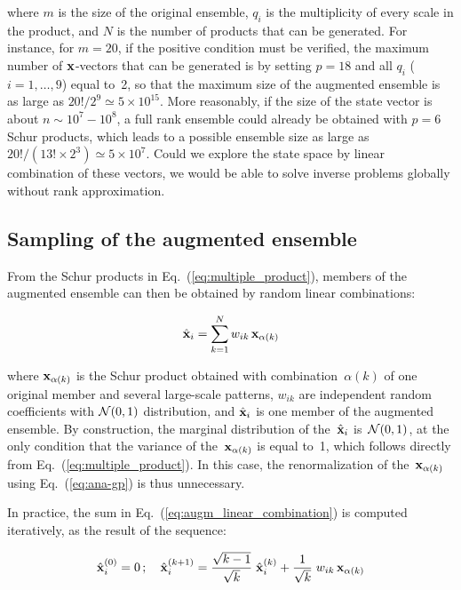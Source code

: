 \documentclass[11pt]{article}
\begin{document}
\noindent
where $m$ is the size of the original ensemble,
$q_i$ is the multiplicity of every scale in the product, and
$N$ is the number of products that can be generated.
For instance, for $m=20$, if the positive condition must be verified,
the maximum number of ${\bf x}$-vectors that can be generated is
by setting $p=18$ and all $q_i$ ($i=1,\ldots,9$) equal to~2,
so that the maximum size of the augmented ensemble is
as large as $20!/2^9 \simeq 5 \times 10^{15}$.
More reasonably, if the size of the state vector is about $n\sim 10^7 - 10^8$,
a full rank ensemble could already be obtained with $p=6$ Schur products,
which leads to a possible ensemble size
as large as $20!/(13!\times 2^3) \simeq 5 \times 10^{7}$.
Could we explore the state space by linear combination of these vectors,
we would be able to solve inverse problems globally without rank approximation.

\subsection{Sampling of the augmented ensemble}

From the Schur products in Eq.~(\ref{eq:multiple_product}), members of the augmented ensemble
can then be obtained by random linear combinations:

\begin{equation}
\label{eq:augm_linear_combination}
\hat{\bf x}_i = \sum_{k=1}^{N} w_{ik} \, {\bf x}_{\alpha(k)}
\end{equation}

\noindent
where ${\bf x}_{\alpha(k)}$ is the Schur product obtained with combination~$\alpha(k)$
of one original member and several large-scale patterns,
$w_{ik}$ are independent random coefficients with ${\cal N}(0,1)$ distribution,
and $\hat{\bf x}_i$ is one member of the augmented ensemble.
By construction, the marginal distribution of the~$\hat{\bf x}_i$ is~${\cal N}(0,1)$,
at the only condition that the variance of the~${\bf x}_{\alpha(k)}$ is equal to~1,
which follows directly from Eq.~(\ref{eq:multiple_product}).
In this case, the renormalization of the~${\bf x}_{\alpha(k)}$
using Eq.~(\ref{eq:ana-gp}) is thus unnecessary.

In practice, the sum in Eq.~(\ref{eq:augm_linear_combination}) is computed iteratively,
as the result of the sequence:

\begin{equation}
\label{eq:augm_chain}
\hat{\bf x}_i^{(0)} = 0 \, ; \quad
\hat{\bf x}_i^{(k+1)} = \frac{\sqrt{k-1}}{\sqrt{k}} \; \hat{\bf x}_i^{(k)}
                      + \frac{1}{\sqrt{k}} \; w_{ik} \, {\bf x}_{\alpha(k)}
\end{equation}
\end{document}
